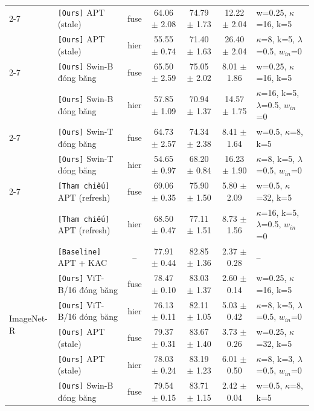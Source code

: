\documentclass[10pt,a4paper]{article}
\newcommand{\src}[1]{\texttt{[#1]}}
\begin{document}
{\begin{longtable}{llcccc l}
\cmidrule(l){2-7}
 & \src{Ours} APT (stale) & fuse & 64.06 $\pm$ 2.08 & 74.79 $\pm$ 1.73 & 12.22 $\pm$ 2.04 & {\scriptsize w=0.25, $\kappa$=16, k=5} \\
 & \src{Ours} APT (stale) & hier & 55.55 $\pm$ 0.74 & 71.40 $\pm$ 1.63 & 26.40 $\pm$ 2.04 & {\scriptsize $\kappa$=8, k=5, $\lambda$=0.5, $w_{in}$=0} \\
\cmidrule(l){2-7}
 & \src{Ours} Swin-B đóng băng & fuse & 65.50 $\pm$ 2.59 & 75.05 $\pm$ 2.02 & 8.01 $\pm$ 1.86 & {\scriptsize w=0.25, $\kappa$=16, k=5} \\
 & \src{Ours} Swin-B đóng băng & hier & 57.85 $\pm$ 1.09 & 70.94 $\pm$ 1.37 & 14.57 $\pm$ 1.75 & {\scriptsize $\kappa$=16, k=5, $\lambda$=0.5, $w_{in}$=0} \\
\cmidrule(l){2-7}
 & \src{Ours} Swin-T đóng băng & fuse & 64.73 $\pm$ 2.57 & 74.34 $\pm$ 2.38 & 8.41 $\pm$ 1.64 & {\scriptsize w=0.5, $\kappa$=8, k=5} \\
 & \src{Ours} Swin-T đóng băng & hier & 54.65 $\pm$ 0.97 & 68.20 $\pm$ 0.84 & 16.23 $\pm$ 1.90 & {\scriptsize $\kappa$=8, k=5, $\lambda$=0.5, $w_{in}$=0} \\
\cmidrule(l){2-7}
 & \src{Tham chiếu} APT (refresh) & fuse & 69.06 $\pm$ 0.35 & 75.90 $\pm$ 1.50 & 5.80 $\pm$ 2.09 & {\scriptsize w=0.5, $\kappa$=32, k=5} \\
 & \src{Tham chiếu} APT (refresh) & hier & 68.50 $\pm$ 0.47 & 77.11 $\pm$ 1.51 & 8.73 $\pm$ 1.56 & {\scriptsize $\kappa$=16, k=5, $\lambda$=0.5, $w_{in}$=0} \\
\midrule
\multirow{11}{*}{ImageNet-R} & \src{Baseline} APT + KAC & -- & 77.91 $\pm$ 0.44 & 82.85 $\pm$ 1.36 & 2.37 $\pm$ 0.28 & {\scriptsize --} \\
\cmidrule(l){2-7}
 & \src{Ours} ViT-B/16 đóng băng & fuse & 78.47 $\pm$ 0.10 & 83.03 $\pm$ 1.37 & 2.60 $\pm$ 0.14 & {\scriptsize w=0.25, $\kappa$=16, k=5} \\
 & \src{Ours} ViT-B/16 đóng băng & hier & 76.13 $\pm$ 0.11 & 82.11 $\pm$ 1.05 & 5.03 $\pm$ 0.42 & {\scriptsize $\kappa$=8, k=5, $\lambda$=0.5, $w_{in}$=0} \\
\cmidrule(l){2-7}
 & \src{Ours} APT (stale) & fuse & 79.37 $\pm$ 0.31 & 83.67 $\pm$ 1.40 & 3.73 $\pm$ 0.26 & {\scriptsize w=0.25, $\kappa$=32, k=5} \\
 & \src{Ours} APT (stale) & hier & 78.03 $\pm$ 0.24 & 83.19 $\pm$ 1.23 & 6.01 $\pm$ 0.50 & {\scriptsize $\kappa$=8, k=3, $\lambda$=0.5, $w_{in}$=0} \\
\cmidrule(l){2-7}
 & \src{Ours} Swin-B đóng băng & fuse & 79.54 $\pm$ 0.15 & 83.71 $\pm$ 1.15 & 2.42 $\pm$ 0.04 & {\scriptsize w=0.5, $\kappa$=8, k=5} \\

\end{longtable}}
\end{document}
